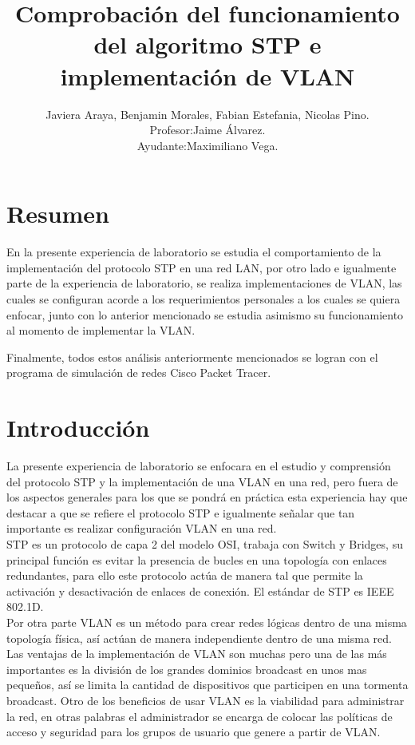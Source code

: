 \documentclass[spanish]{udpreport}
\title{Comprobación del funcionamiento del algoritmo STP e implementación de VLAN}
\author{Javiera Araya,
       Benjamin Morales,
        Fabian Estefania,
        Nicolas Pino.\\
        Profesor:Jaime Álvarez.\\
        Ayudante:Maximiliano Vega.}
\begin{document}
\maketitle




\chapter*{Resumen} 




En la presente experiencia de laboratorio se estudia el comportamiento de la implementación del protocolo STP en una red LAN, por otro lado e igualmente parte de la experiencia de laboratorio, se realiza implementaciones de VLAN, las cuales se configuran acorde a los requerimientos personales a los cuales se quiera enfocar, junto con lo anterior mencionado se estudia asimismo su funcionamiento al momento de implementar la VLAN.

Finalmente, todos estos análisis anteriormente mencionados se logran con el programa de simulación de redes Cisco Packet Tracer.

\tableofcontents

\chapter{Introducción}
La presente experiencia de laboratorio se enfocara en el estudio y comprensión del protocolo STP y la implementación de una VLAN en una red, pero fuera de los aspectos generales para los que se pondrá en práctica esta experiencia hay que destacar a que se refiere el protocolo STP e igualmente señalar que tan importante es realizar configuración VLAN en una red.\\

STP es un protocolo de capa 2 del modelo OSI, trabaja con Switch y Bridges, su principal función es evitar la presencia de bucles en una topología con enlaces redundantes, para ello este protocolo actúa de manera tal que permite la activación y desactivación de enlaces de conexión. El estándar de STP es IEEE 802.1D.\\

Por otra parte VLAN es un método para crear redes lógicas dentro de una misma topología física, así actúan de manera independiente dentro de una misma red. Las ventajas de la implementación de VLAN son muchas pero una de las más importantes es la división de los grandes dominios broadcast en unos mas pequeños, así se limita la cantidad de dispositivos que participen en una tormenta broadcast. Otro de los beneficios de usar VLAN es la viabilidad para administrar la red, en otras palabras el administrador se encarga de colocar las políticas de acceso y seguridad para los grupos de usuario que genere a partir de VLAN.
\end{document}
